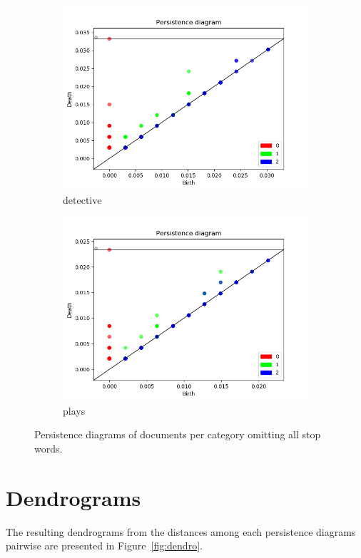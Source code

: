 \documentclass[fleqn]{article}
\begin{document}
\begin{figure}
\begin{subfigure}[t]{0.425\textwidth}
			\includegraphics[width=\textwidth]{figures/stopwords_excluded/detective.png}
			\caption{detective}
			\label{fig:sw:detective}
		\end{subfigure}\hfill
		\begin{subfigure}[t]{0.425\textwidth}
			\includegraphics[width=\textwidth]{figures/stopwords_excluded/plays.png}
			\caption{plays}
			\label{fig:sw:plays}
		\end{subfigure}\hfill
		\caption{Persistence diagrams of documents per category omitting all stop words.}
		\label{fig:sw}
	\end{figure}
	
	\section{Dendrograms} \label{app:dendro}
	The resulting dendrograms from the distances among each persistence diagrams pairwise are presented in Figure~\ref{fig:dendro}.
	
\end{document}
